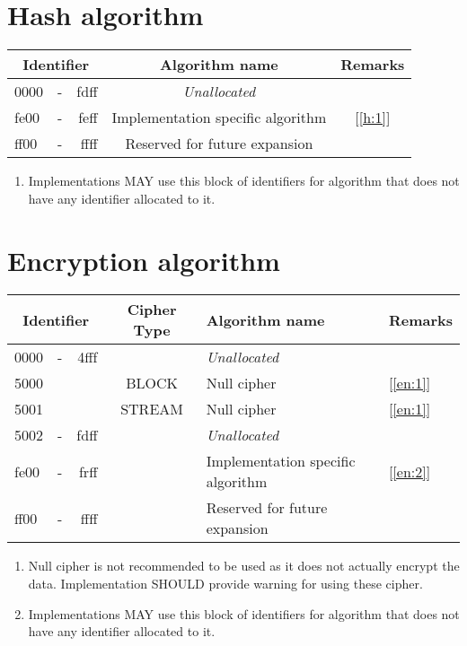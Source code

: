 \documentclass[a4paper,12pt]{article}
\newcommand{\see}[1]{[\ref{#1}]}
\begin{document}
	\section{Hash algorithm}
		\begin{tabular}{|lcr||c|c|}
			\hline 
			\multicolumn{3}{|c||}{Identifier} &  Algorithm name & Remarks \\\hline 
			0000&-&fdff&\textit{Unallocated}&  \\\hline
			fe00&-&feff&Implementation specific algorithm& \see{h:1}\\\hline
			ff00&-&ffff&Reserved for future expansion&  \\\hline 
		\end{tabular} 
		\begin{enumerate}
			\item \label{h:1}Implementations MAY use this block of identifiers for algorithm that does not have any identifier allocated to it.
		\end{enumerate}
	\section{Encryption algorithm}
		\begin{tabular}{|lcr||c|l|l|}
			\hline 
			\multicolumn{3}{|c||}{Identifier} & Cipher Type & Algorithm name & Remarks \\ 
			\hline 
			0000&-&4fff&  &\textit{Unallocated}&  \\\hline 
			5000&&& BLOCK & Null cipher& \see{en:1} \\\hline 
			5001&&& STREAM&Null cipher& \see{en:1} \\\hline  
			5002&-&fdff&  &\textit{Unallocated}&  \\\hline 
			fe00&-&frff&  &Implementation specific algorithm& \see{en:2} \\\hline 
			ff00&-&ffff&  &Reserved for future expansion&  \\\hline
		\end{tabular} 
		\begin{enumerate}
			\item \label{en:1}Null cipher is not recommended to be used as it does not actually encrypt the
			data. Implementation SHOULD provide warning for using these cipher.
			\item \label{en:2}Implementations MAY use this block of identifiers for algorithm that does not have any identifier allocated to it.
		\end{enumerate}
\end{document}
